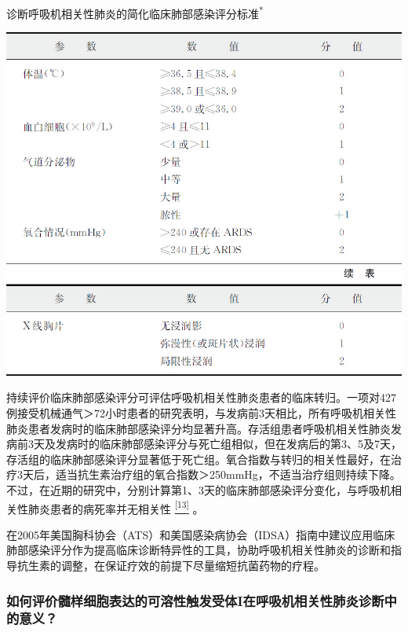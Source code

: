 \begin{table}[htbp]
\centering
\caption{诊断呼吸机相关性肺炎的简化临床肺部感染评分标准\textsuperscript{*}}
\label{tab8-4}
\includegraphics{./images/Image00062.jpg}
\includegraphics{./images/Image00063.jpg}
\end{table}

持续评价临床肺部感染评分可评估呼吸机相关性肺炎患者的临床转归。一项对427例接受机械通气＞72小时患者的研究表明，与发病前3天相比，所有呼吸机相关性肺炎患者发病时的临床肺部感染评分均显著升高。存活组患者呼吸机相关性肺炎发病前3天及发病时的临床肺部感染评分与死亡组相似，但在发病后的第3、5及7天，存活组的临床肺部感染评分显著低于死亡组。氧合指数与转归的相关性最好，在治疗3天后，适当抗生素治疗组的氧合指数＞250mmHg，不适当治疗组则持续下降。不过，在近期的研究中，分别计算第1、3天的临床肺部感染评分变化，与呼吸机相关性肺炎患者的病死率并无相关性
\protect\hyperlink{text00014.htmlux5cux23ch13-13}{\textsuperscript{{[}13{]}}}
。

在2005年美国胸科协会（ATS）和美国感染病协会（IDSA）指南中建议应用临床肺部感染评分作为提高临床诊断特异性的工具，协助呼吸机相关性肺炎的诊断和指导抗生素的调整，在保证疗效的前提下尽量缩短抗菌药物的疗程。

\subsubsection{如何评价髓样细胞表达的可溶性触发受体I在呼吸机相关性肺炎诊断中的意义？}

